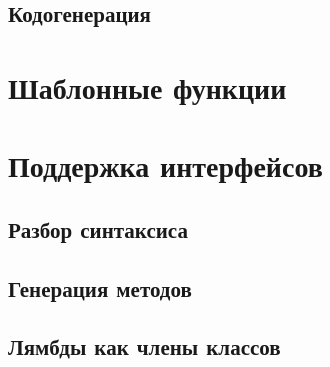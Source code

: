\subsection{Кодогенерация}

\section{Шаблонные функции}

\section{Поддержка интерфейсов}
\subsection{Разбор синтаксиса}
\subsection{Генерация методов}
\subsection{Лямбды как члены классов}

\chapterconclusion

